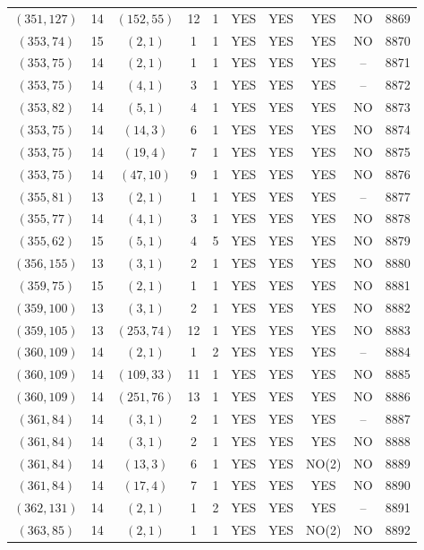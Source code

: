 \begin{longtable}{|c|c|c|c|c|c|c|c|c|c|}
$(351, 127)$ & 14 & $(152, 55)$ & 12 & 1 & YES & YES & YES & NO & 8869\\
$(353, 74)$ & 15 & $(2, 1)$ & 1 & 1 & YES & YES & YES & NO & 8870\\
$(353, 75)$ & 14 & $(2, 1)$ & 1 & 1 & YES & YES & YES & -- & 8871\\
$(353, 75)$ & 14 & $(4, 1)$ & 3 & 1 & YES & YES & YES & -- & 8872\\
$(353, 82)$ & 14 & $(5, 1)$ & 4 & 1 & YES & YES & YES & NO & 8873\\
$(353, 75)$ & 14 & $(14, 3)$ & 6 & 1 & YES & YES & YES & NO & 8874\\
$(353, 75)$ & 14 & $(19, 4)$ & 7 & 1 & YES & YES & YES & NO & 8875\\
$(353, 75)$ & 14 & $(47, 10)$ & 9 & 1 & YES & YES & YES & NO & 8876\\
$(355, 81)$ & 13 & $(2, 1)$ & 1 & 1 & YES & YES & YES & -- & 8877\\
$(355, 77)$ & 14 & $(4, 1)$ & 3 & 1 & YES & YES & YES & NO & 8878\\
$(355, 62)$ & 15 & $(5, 1)$ & 4 & 5 & YES & YES & YES & NO & 8879\\
$(356, 155)$ & 13 & $(3, 1)$ & 2 & 1 & YES & YES & YES & NO & 8880\\
$(359, 75)$ & 15 & $(2, 1)$ & 1 & 1 & YES & YES & YES & NO & 8881\\
$(359, 100)$ & 13 & $(3, 1)$ & 2 & 1 & YES & YES & YES & NO & 8882\\
$(359, 105)$ & 13 & $(253, 74)$ & 12 & 1 & YES & YES & YES & NO & 8883\\
$(360, 109)$ & 14 & $(2, 1)$ & 1 & 2 & YES & YES & YES & -- & 8884\\
$(360, 109)$ & 14 & $(109, 33)$ & 11 & 1 & YES & YES & YES & NO & 8885\\
$(360, 109)$ & 14 & $(251, 76)$ & 13 & 1 & YES & YES & YES & NO & 8886\\
$(361, 84)$ & 14 & $(3, 1)$ & 2 & 1 & YES & YES & YES & -- & 8887\\
$(361, 84)$ & 14 & $(3, 1)$ & 2 & 1 & YES & YES & YES & NO & 8888\\
$(361, 84)$ & 14 & $(13, 3)$ & 6 & 1 & YES & YES & NO(2) & NO & 8889\\
$(361, 84)$ & 14 & $(17, 4)$ & 7 & 1 & YES & YES & YES & NO & 8890\\
$(362, 131)$ & 14 & $(2, 1)$ & 1 & 2 & YES & YES & YES & -- & 8891\\
$(363, 85)$ & 14 & $(2, 1)$ & 1 & 1 & YES & YES & NO(2) & NO & 8892\\

\end{longtable}

